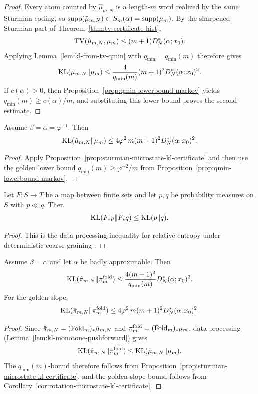 \begin{proof}
Every atom counted by \(\hat\mu_{m,N}\) is a length-\(m\) word realized by the
same Sturmian coding, so
\(\operatorname{supp}(\hat\mu_{m,N})\subset S_m(\alpha)=\operatorname{supp}(\mu_m)\).  By the sharpened
Sturmian part of Theorem~\ref{thm:tv-certificate-hist},
\[
\operatorname{TV}(\hat\mu_{m,N},\mu_m)\le (m+1)D_N^*(\alpha;x_0).
\]
Applying Lemma~\ref{lem:kl-from-tv-qmin} with
\(q_{\min}=q_{\min}(m)\) therefore gives
\[
\operatorname{KL}(\hat\mu_{m,N}\|\mu_m)
\le
\frac{4}{q_{\min}(m)}(m+1)^2D_N^*(\alpha;x_0)^2.
\]
If \(c(\alpha)>0\), then Proposition~\ref{prop:qmin-lowerbound-markov} yields
\(q_{\min}(m)\ge c(\alpha)/m\), and substituting this lower bound proves the
second estimate.
\end{proof}

\begin{corollary}\label{cor:rotation-microstate-kl-certificate}
Assume \(\beta=\alpha=\varphi^{-1}\).  Then
\[
\operatorname{KL}(\hat\mu_{m,N}\|\mu_m)
\le
4\varphi^2\,m(m+1)^2 D_N^*(\alpha;x_0)^2.
\]
\end{corollary}

\begin{proof}
Apply Proposition~\ref{prop:sturmian-microstate-kl-certificate} and then use
the golden lower bound
\(q_{\min}(m)\ge \varphi^{-2}/m\) from
Proposition~\ref{prop:qmin-lowerbound-markov}.
\end{proof}

\begin{lemma}\label{lem:kl-monotone-pushforward}
Let $F:S\to T$ be a map between finite sets and let $p,q$ be probability
measures on $S$ with $p\ll q$.  Then
\[
\operatorname{KL}(F_*p\|F_*q)\le \operatorname{KL}(p\|q).
\]
\end{lemma}

\begin{proof}
This is the data-processing inequality for relative entropy under deterministic
coarse graining \cite{CoverThomas2006}.
\end{proof}

\begin{corollary}\label{cor:rotation-folded-kl-certificate}
Assume \(\beta=\alpha\) and let \(\alpha\) be badly approximable. Then
\[
\operatorname{KL}(\hat\pi_{m,N}\|\pi_m^{\mathrm{fold}})
\le
\frac{4(m+1)^2}{q_{\min}(m)}D_N^*(\alpha;x_0)^2.
\]
For the golden slope,
\[
\operatorname{KL}(\hat\pi_{m,N}\|\pi_m^{\mathrm{fold}})
\le
4\varphi^2\,m(m+1)^2 D_N^*(\alpha;x_0)^2.
\]
\end{corollary}

\begin{proof}
Since \(\hat\pi_{m,N}=(\mathrm{Fold}_m)_*\hat\mu_{m,N}\) and
\(\pi_m^{\mathrm{fold}}=(\mathrm{Fold}_m)_*\mu_m\), data processing
(Lemma~\ref{lem:kl-monotone-pushforward}) gives
\[
\operatorname{KL}(\hat\pi_{m,N}\|\pi_m^{\mathrm{fold}})
\le
\operatorname{KL}(\hat\mu_{m,N}\|\mu_m).
\]
The \(q_{\min}(m)\)-bound therefore follows from
Proposition~\ref{prop:sturmian-microstate-kl-certificate}, and the
golden-slope bound follows from
Corollary~\ref{cor:rotation-microstate-kl-certificate}.
\end{proof}

